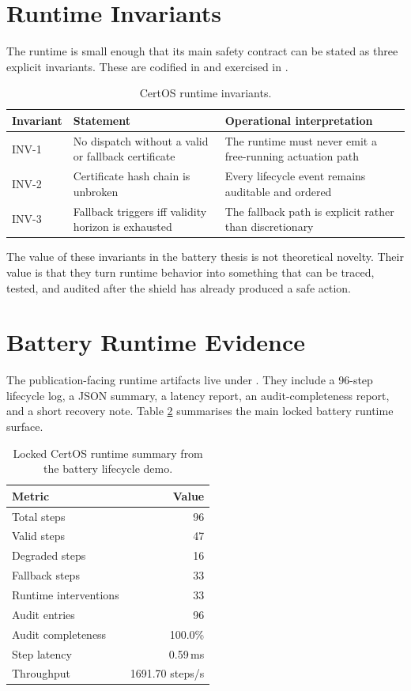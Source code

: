 \section{Runtime Invariants}

The runtime is small enough that its main safety contract can be stated as
three explicit invariants.  These are codified in
 and exercised in
.

\begin{table}[ht]
\centering
\caption{CertOS runtime invariants.}
\label{tab:certos-invariants}
\begin{tabular}{p{1.6cm}p{4.0cm}p{5.4cm}}
\toprule
\textbf{Invariant} & \textbf{Statement} & \textbf{Operational interpretation} \\
\midrule
INV-1 & No dispatch without a valid or fallback certificate & The runtime must never emit a free-running actuation path \\
INV-2 & Certificate hash chain is unbroken & Every lifecycle event remains auditable and ordered \\
INV-3 & Fallback triggers iff validity horizon is exhausted & The fallback path is explicit rather than discretionary \\
\bottomrule
\end{tabular}
\end{table}

The value of these invariants in the battery thesis is not theoretical
novelty.  Their value is that they turn runtime behavior into something
that can be traced, tested, and audited after the shield has already
produced a safe action.

\section{Battery Runtime Evidence}

The publication-facing runtime artifacts live under .
They include a 96-step lifecycle log, a JSON summary, a latency report, an
audit-completeness report, and a short recovery note.  Table
\ref{tab:certos-runtime-summary} summarises the main locked battery runtime
surface.

\begin{table}[ht]
\centering
\caption{Locked CertOS runtime summary from the battery lifecycle demo.}
\label{tab:certos-runtime-summary}
\begin{tabular}{lr}
\toprule
\textbf{Metric} & \textbf{Value} \\
\midrule
Total steps & 96 \\
Valid steps & 47 \\
Degraded steps & 16 \\
Fallback steps & 33 \\
Runtime interventions & 33 \\
Audit entries & 96 \\
Audit completeness & 100.0\% \\
Step latency & 0.59\,ms \\
Throughput & 1691.70 steps/s \\
\bottomrule
\end{tabular}
\end{table}

